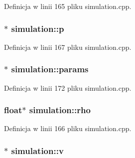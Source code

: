 Definicja w linii 165 pliku simulation.\-cpp.

\hypertarget{classsimulation_a5412fd01febe99f12ae38e30eb692ff0}{
\subsubsection[{p}]{$\ast$ simulation\-::p\hspace{0.3cm}{\ttfamily [private]}}}\label{classsimulation_a5412fd01febe99f12ae38e30eb692ff0}


Definicja w linii 167 pliku simulation.\-cpp.

\hypertarget{classsimulation_a861b82cc3c0e7e58abfba464a133dae3}{
\subsubsection[{params}]{$\ast$ simulation\-::params\hspace{0.3cm}{\ttfamily [private]}}}\label{classsimulation_a861b82cc3c0e7e58abfba464a133dae3}


Definicja w linii 172 pliku simulation.\-cpp.

\hypertarget{classsimulation_a44081d4edd92e17a3e1067b976031a00}{
\subsubsection[{rho}]{\setlength{\rightskip}{0pt plus 5cm}float$\ast$ simulation\-::rho\hspace{0.3cm}{\ttfamily [private]}}}\label{classsimulation_a44081d4edd92e17a3e1067b976031a00}


Definicja w linii 166 pliku simulation.\-cpp.

\hypertarget{classsimulation_a39dbad79b1b8667840638a35e839a3f7}{
\subsubsection[{v}]{$\ast$ simulation\-::v\hspace{0.3cm}{\ttfamily [private]}}}\label{classsimulation_a39dbad79b1b8667840638a35e839a3f7}


